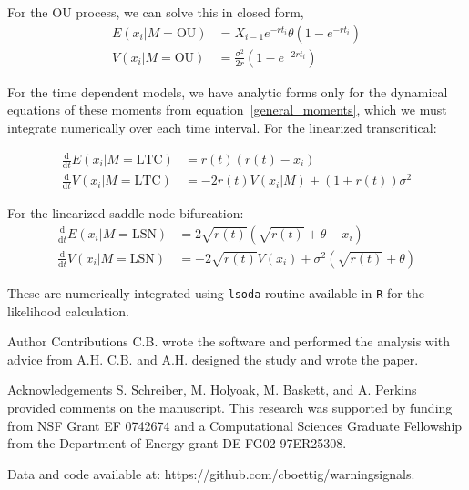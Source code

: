 \documentclass{pnastwo}
\newcommand{\ud}{\mathrm{d}}
\begin{document}
\begin{article}
For the OU process, we can solve this in closed form, 
\begin{align}
  E(x_i| M = \text{OU}) &= X_{i-1} e^{-r t_i} \theta \left(1 - e^{-rt_i} \right) \\
V(x_i| M = \text{OU}) &= \frac{\sigma^2}{2 r} \left(1 - e^{-2 r t_i} \right)
\label{OUsoln}
\end{align}

For the time dependent models, we have analytic forms only for the dynamical equations of these moments from equation~\eqref{general_moments}, which we must integrate numerically over each time interval. For the linearized transcritical:

\begin{align}
\frac{\ud }{\ud t} E(x_i| M = \text{LTC})&=  r(t)(r(t) - x_i) \\
\frac{\ud}{\ud t} V(x_i| M = \text{LTC}) &=  -2 r(t) V(x_i|M) + (1+r(t))\sigma^2 
\label{LTCsoln}
\end{align}

For the linearized saddle-node bifurcation:
\begin{align}
\frac{\ud }{\ud t} E(x_i| M = \text{LSN})&=  2\sqrt{r(t)}(\sqrt{r(t)}+\theta - x_i) \\
\frac{\ud}{\ud t} V(x_i| M = \text{LSN}) &=  -2 \sqrt{r(t)} V(x_i) + \sigma^2 ( \sqrt{r(t)}+\theta )
\label{LSNsoln}
\end{align}

These are numerically integrated using \texttt{lsoda} routine available in \texttt{R} for the likelihood calculation.  

                           

                             \begin{acknowledgments}

Author Contributions
C.B. wrote the software and performed the analysis with advice from A.H.  C.B. and A.H. designed the study and wrote the paper.  

Acknowledgements
S. Schreiber, M. Holyoak, M. Baskett, and A. Perkins provided comments on the manuscript.  This research was supported by funding from NSF Grant EF 0742674 and a Computational Sciences Graduate Fellowship from the Department of Energy grant DE-FG02-97ER25308.

Data and code available at: https://github.com/cboettig/warningsignals. 
                             \end{acknowledgments}


\end{article}
\end{document}
